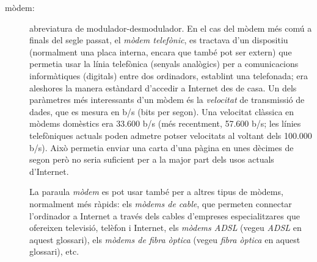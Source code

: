 \begin{description}
\item[mòdem:] abreviatura de modulador-desmodulador. En el cas del
  mòdem més comú a finals del segle passat, el \emph{mòdem telefònic},
  es tractava d'un dispositiu (normalment una placa interna, encara
  que també pot ser extern) que permetia usar la línia telefònica
  (senyals analògics) per a comunicacions informàtiques (digitals)
  entre dos ordinadors, establint una telefonada; era aleshores la
  manera estàndard d'accedir a Internet des de casa. Un dels
  paràmetres més interessants d'un mòdem és la
  \emph{velocitat} de transmissió de dades, que es mesura en b/s (bits
  per segon). Una velocitat clàssica en mòdems domèstics era 33.600
  b/s (més recentment, 57.600 b/s; les línies telefòniques actuals
  poden admetre potser velocitats al voltant dels 100.000 b/s).  Això
  permetia enviar una carta d'una pàgina en unes dècimes de segon però
  no seria suficient per a la major part dels usos actuals d'Internet.

  La paraula \emph{mòdem} es pot usar també per a altres tipus de
  mòdems, normalment més ràpids: els \emph{mòdems de cable}, que
  permeten connectar l'ordinador a Internet a través dels cables
  d'empreses especialitzares que ofereixen televisió, telèfon i
  Internet, els \emph{mòdems ADSL} (vegeu \emph{ADSL} en aquest
  glossari), els \emph{mòdems de fibra òptica} (vegeu \emph{fibra
    òptica} en aquest glossari), etc.



\end{description}
